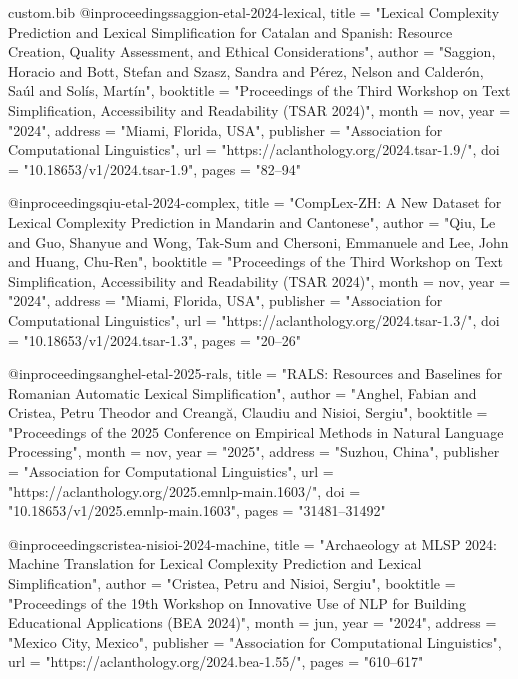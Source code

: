 \begin{filecontents*}[overwrite]{custom.bib}
@inproceedings{saggion-etal-2024-lexical,
    title = "Lexical Complexity Prediction and Lexical Simplification for {C}atalan and {S}panish: Resource Creation, Quality Assessment, and Ethical Considerations",
    author = "Saggion, Horacio  and
      Bott, Stefan  and
      Szasz, Sandra  and
      P{\'e}rez, Nelson  and
      Calder{\'o}n, Sa{\'u}l  and
      Sol{\'i}s, Mart{\'i}n",
    booktitle = "Proceedings of the Third Workshop on Text Simplification, Accessibility and Readability (TSAR 2024)",
    month = nov,
    year = "2024",
    address = "Miami, Florida, USA",
    publisher = "Association for Computational Linguistics",
    url = "https://aclanthology.org/2024.tsar-1.9/",
    doi = "10.18653/v1/2024.tsar-1.9",
    pages = "82--94"
}

@inproceedings{qiu-etal-2024-complex,
    title = "{C}omp{L}ex-{ZH}: A New Dataset for Lexical Complexity Prediction in {M}andarin and {C}antonese",
    author = "Qiu, Le  and
      Guo, Shanyue  and
      Wong, Tak-Sum  and
      Chersoni, Emmanuele  and
      Lee, John  and
      Huang, Chu-Ren",
    booktitle = "Proceedings of the Third Workshop on Text Simplification, Accessibility and Readability (TSAR 2024)",
    month = nov,
    year = "2024",
    address = "Miami, Florida, USA",
    publisher = "Association for Computational Linguistics",
    url = "https://aclanthology.org/2024.tsar-1.3/",
    doi = "10.18653/v1/2024.tsar-1.3",
    pages = "20--26"
}

@inproceedings{anghel-etal-2025-rals,
    title = "{RALS}: Resources and Baselines for {R}omanian Automatic Lexical Simplification",
    author = "Anghel, Fabian  and
      Cristea, Petru Theodor  and
      Creang{\u{a}}, Claudiu  and
      Nisioi, Sergiu",
    booktitle = "Proceedings of the 2025 Conference on Empirical Methods in Natural Language Processing",
    month = nov,
    year = "2025",
    address = "Suzhou, China",
    publisher = "Association for Computational Linguistics",
    url = "https://aclanthology.org/2025.emnlp-main.1603/",
    doi = "10.18653/v1/2025.emnlp-main.1603",
    pages = "31481--31492"
}

@inproceedings{cristea-nisioi-2024-machine,
    title = "Archaeology at {MLSP} 2024: Machine Translation for Lexical Complexity Prediction and Lexical Simplification",
    author = "Cristea, Petru  and
      Nisioi, Sergiu",
    booktitle = "Proceedings of the 19th Workshop on Innovative Use of NLP for Building Educational Applications (BEA 2024)",
    month = jun,
    year = "2024",
    address = "Mexico City, Mexico",
    publisher = "Association for Computational Linguistics",
    url = "https://aclanthology.org/2024.bea-1.55/",
    pages = "610--617"
}


\end{filecontents*}
